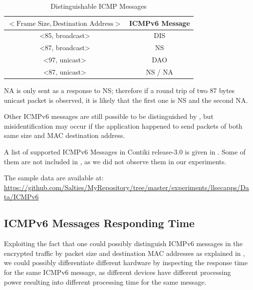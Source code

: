 \begin{table}[ht!]
	\centering
	\begin{tabular}{|c|c|}
		\hline
		$<\text{Frame Size}, \text{Destination Address}>$                     & ICMPv6 Message \\ \hline
		\textless85, broadcast\textgreater & DIS            \\ \hline
		\textless87, broadcast\textgreater & NS             \\ \hline
		\textless97, unicast\textgreater   & DAO            \\ \hline
		\textless87, unicast\textgreater   & NS / NA        \\ \hline
	\end{tabular}
	\caption{Distinguishable ICMP Messages}
	\label{Tbl: Distinguishable ICMP Messages}
\end{table}

NA is only sent as a response to NS; therefore if a round trip of two 87 bytes unicast packet is observed, it is likely that the first one is NS and the second NA.  

Other ICMPv6 messages are still possible to be distinguished by , but misidentification may occur if the application happened to send packets of both same size and MAC destination address.

A list of supported ICMPv6 Messages in Contiki release-3.0 is given in . Some of them are not included in , as we did not observe them in our experiments.

The sample data are available at:\\
\url{https://github.com/Salties/MyRepository/tree/master/experiments/llsecapps/Data/ICMPv6}

\subsection{ICMPv6 Messages Responding Time}

Exploiting the fact that one could possibly distinguish ICMPv6 messages in the encrypted traffic by packet size and destination MAC addresses as explained in , we could possibly  differentiate different hardware by inspecting the response time for the same ICMPv6 message, as different devices have different processing power resulting into different processing time for the same message.

